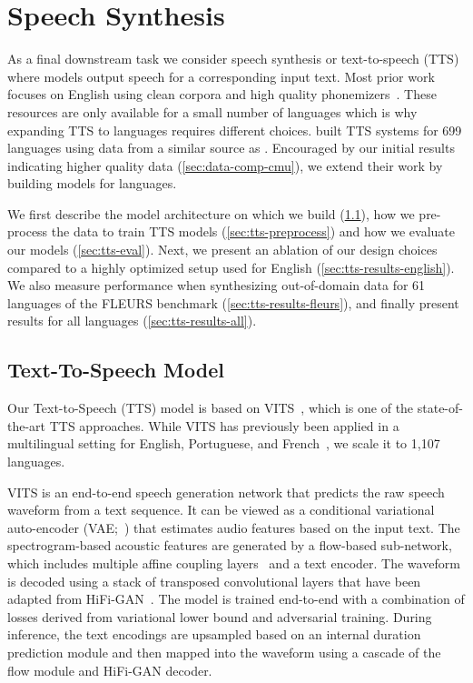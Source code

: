 \section{Speech Synthesis}
\label{sec:tts}

As a final downstream task we consider speech synthesis or text-to-speech (TTS) where models output speech for a corresponding input text.
Most prior work focuses on English using clean corpora and high quality phonemizers~\citep{tan2021survey}.
These resources are only available for a small number of languages which is why expanding TTS to \nummmslang{} languages requires different choices.
\citet{black2019cmu} built TTS systems for 699 languages using data from a similar source as \MMS{}.
Encouraged by our initial results indicating higher quality data (\textsection\ref{sec:data-comp-cmu}), we extend their work by building models for \nummmslang{} languages.

We first describe the model architecture on which we build (\textsection\ref{sec:tts-model}), 
how we pre-process the data to train TTS models (\textsection\ref{sec:tts-preprocess}) and how we evaluate our models (\textsection\ref{sec:tts-eval}).
Next, we present an ablation of our design choices compared to a highly optimized setup used for English (\textsection\ref{sec:tts-results-english}).
We also measure performance when synthesizing out-of-domain data for 61 languages of the FLEURS benchmark (\textsection\ref{sec:tts-results-fleurs}), and finally present results for all \nummmslang{} languages (\textsection\ref{sec:tts-results-all}).



\subsection{Text-To-Speech Model}
\label{sec:tts-model}

Our Text-to-Speech (TTS) model is based on VITS~\citep{kim2021conditional}, which is one of the state-of-the-art TTS approaches. 
While VITS has previously been applied in a multilingual setting for English, Portuguese, and French~\citep{casanova2022yourtts}, we scale it to 1,107 languages.

VITS is an end-to-end speech generation network that predicts the raw speech waveform from a text sequence. 
It can be viewed as a conditional variational auto-encoder (VAE;~\citealt{Kingma2013AutoEncodingVB}) that estimates audio features based on the input text. The spectrogram-based acoustic features are generated by a flow-based sub-network, which includes multiple affine coupling layers~\citep{dinh2017density} and a text encoder. 
The waveform is decoded using a stack of transposed convolutional layers that have been adapted from HiFi-GAN~\citep{kong2020hifi}. The model is trained end-to-end with a combination of losses derived from variational lower bound and adversarial training. During inference, the text encodings are upsampled based on an internal duration prediction module and then mapped into the waveform using a cascade of the flow module and HiFi-GAN decoder.

